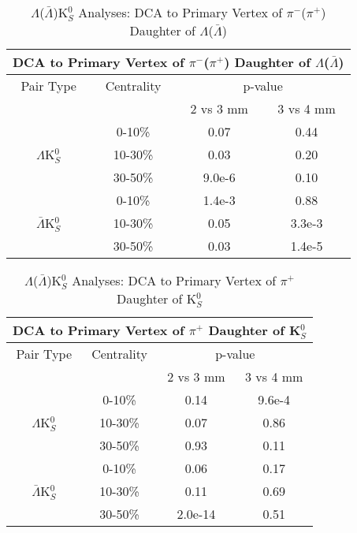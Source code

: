 \documentclass[../AnalysisNoteJBuxton.tex]{subfiles}
\begin{document}
\begin{table}
 \centering
 \begin{tabular}{|c|c|c|c|}
 \multicolumn{4}{c}{DCA to Primary Vertex of $\pi^{-}$($\pi^{+}$) Daughter of $\Lambda$($\bar{\Lambda}$)} \\
  \hline
  Pair Type & Centrality & \multicolumn{2}{c|}{p-value} \\
  \cline{3-4}
   & & 2 vs 3 mm & 3 vs 4 mm \\
  \hline
   & 0-10\% & 0.07 & 0.44 \\
  $\Lambda$K$^{0}_{S}$ 
   & 10-30\% & 0.03 & 0.20 \\
   & 30-50\% & 9.0e-6 & 0.10 \\
  \hline
   & 0-10\% & 1.4e-3 & 0.88 \\
  $\bar{\Lambda}$K$^{0}_{S}$ 
   & 10-30\% & 0.05 & 3.3e-3 \\
   & 30-50\% & 0.03 & 1.4e-5 \\
  \hline
 \end{tabular}
 \caption{$\Lambda$($\bar{\Lambda}$)K$^{0}_{S}$ Analyses: DCA to Primary Vertex of $\pi^{-}$($\pi^{+}$) Daughter of $\Lambda$($\bar{\Lambda}$)}
 \label{tab:DcaToPrimVertexPionDaughtOfLamLamK0}
\end{table}

\begin{table}
 \centering
 \begin{tabular}{|c|c|c|c|}
 \multicolumn{4}{c}{DCA to Primary Vertex of $\pi^{+}$ Daughter of K$^{0}_{S}$} \\
  \hline
  Pair Type & Centrality & \multicolumn{2}{c|}{p-value} \\
  \cline{3-4}
   & & 2 vs 3 mm & 3 vs 4 mm \\
  \hline
   & 0-10\% & 0.14 & 9.6e-4 \\
  $\Lambda$K$^{0}_{S}$ 
   & 10-30\% & 0.07 & 0.86 \\
   & 30-50\% & 0.93 & 0.11 \\
  \hline
   & 0-10\% & 0.06 & 0.17 \\
  $\bar{\Lambda}$K$^{0}_{S}$ 
   & 10-30\% & 0.11 & 0.69 \\
   & 30-50\% & 2.0e-14 & 0.51 \\
  \hline
 \end{tabular}
 \caption{$\Lambda$($\bar{\Lambda}$)K$^{0}_{S}$ Analyses: DCA to Primary Vertex of $\pi^{+}$ Daughter of K$^{0}_{S}$}
 \label{tab:DcaToPrimVertexPosPionDaughtOfK0LamK0}
\end{table}
\end{document}
